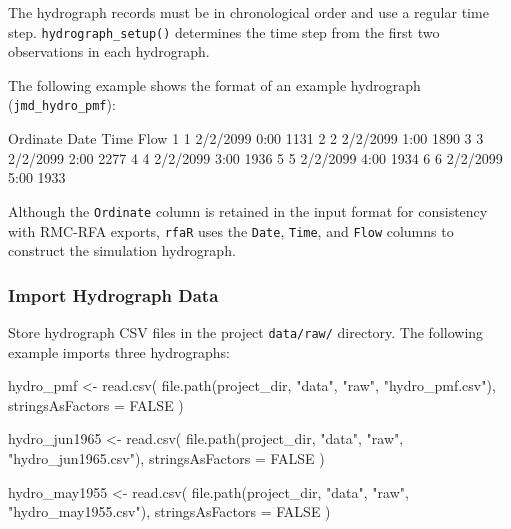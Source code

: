 \documentclass[
  letterpaper,
  DIV=11,
  numbers=noendperiod]{scrreprt}
\newenvironment{Shaded}{\begin{snugshade}}{\end{snugshade}}
\newcommand{\AttributeTok}[1]{\textcolor[rgb]{0.40,0.45,0.13}{#1}}
\newcommand{\ConstantTok}[1]{\textcolor[rgb]{0.56,0.35,0.01}{#1}}
\newcommand{\FunctionTok}[1]{\textcolor[rgb]{0.28,0.35,0.67}{#1}}
\newcommand{\NormalTok}[1]{\textcolor[rgb]{0.00,0.23,0.31}{#1}}
\newcommand{\OtherTok}[1]{\textcolor[rgb]{0.00,0.23,0.31}{#1}}
\newcommand{\StringTok}[1]{\textcolor[rgb]{0.13,0.47,0.30}{#1}}
\begin{document}
The hydrograph records must be in chronological order and use a regular
time step. \texttt{hydrograph\_setup()} determines the time step from
the first two observations in each hydrograph.

The following example shows the format of an example hydrograph
(\texttt{jmd\_hydro\_pmf}):

\begin{Shaded}
\begin{Highlighting}[]
\NormalTok{  Ordinate     Date Time Flow}
\NormalTok{1        1 2/2/2099 0:00 1131}
\NormalTok{2        2 2/2/2099 1:00 1890}
\NormalTok{3        3 2/2/2099 2:00 2277}
\NormalTok{4        4 2/2/2099 3:00 1936}
\NormalTok{5        5 2/2/2099 4:00 1934}
\NormalTok{6        6 2/2/2099 5:00 1933}
\end{Highlighting}
\end{Shaded}

Although the \texttt{Ordinate} column is retained in the input format
for consistency with RMC-RFA exports, \texttt{rfaR} uses the
\texttt{Date}, \texttt{Time}, and \texttt{Flow} columns to construct the
simulation hydrograph.

\subsubsection{Import Hydrograph Data}\label{import-hydrograph-data}

Store hydrograph CSV files in the project \texttt{data/raw/} directory.
The following example imports three hydrographs:

\begin{Shaded}
\begin{Highlighting}[]
\NormalTok{hydro\_pmf }\OtherTok{\textless{}{-}} \FunctionTok{read.csv}\NormalTok{(}
  \FunctionTok{file.path}\NormalTok{(project\_dir, }\StringTok{"data"}\NormalTok{, }\StringTok{"raw"}\NormalTok{, }\StringTok{"hydro\_pmf.csv"}\NormalTok{),}
  \AttributeTok{stringsAsFactors =} \ConstantTok{FALSE}
\NormalTok{)}

\NormalTok{hydro\_jun1965 }\OtherTok{\textless{}{-}} \FunctionTok{read.csv}\NormalTok{(}
  \FunctionTok{file.path}\NormalTok{(project\_dir, }\StringTok{"data"}\NormalTok{, }\StringTok{"raw"}\NormalTok{, }\StringTok{"hydro\_jun1965.csv"}\NormalTok{),}
  \AttributeTok{stringsAsFactors =} \ConstantTok{FALSE}
\NormalTok{)}

\NormalTok{hydro\_may1955 }\OtherTok{\textless{}{-}} \FunctionTok{read.csv}\NormalTok{(}
  \FunctionTok{file.path}\NormalTok{(project\_dir, }\StringTok{"data"}\NormalTok{, }\StringTok{"raw"}\NormalTok{, }\StringTok{"hydro\_may1955.csv"}\NormalTok{),}
  \AttributeTok{stringsAsFactors =} \ConstantTok{FALSE}
\NormalTok{)}
\end{Highlighting}
\end{Shaded}
\end{document}
